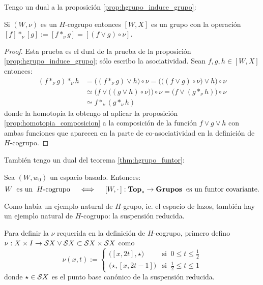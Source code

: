 \documentclass[../../topologia_algebraica]{subfiles}
\begin{document}
Tengo un dual a la proposici\'on \ref{prop:hgrupo_induce_grupo}:

\begin{prop}
  Si $(W,\nu)$ es un $H$-cogrupo entonces $[W,X]$ es un grupo con la operaci\'on
  $[f]*_{\nu}[g]:=[f*_{\nu}g]=[(f\vee g)\circ\nu]$.
\end{prop}

\begin{proof}
  Esta prueba es el dual de la prueba de la proposici\'on \ref{prop:hgrupo_induce_grupo}; s\'olo
  escribo la asociatividad. Sean $f,g,h\in[W,X]$ entonces:
  \begin{align*}
    (f*_{\nu}g)*_{\nu}h & =
    \big((f*_{\nu}g)\vee h\big)\circ\nu =
    \Big(\big((f\vee g)\circ\nu\big) \vee h\Big) \circ\nu \\ & \simeq
    \Big(f\vee \big((g\vee h)\circ\nu\big)\Big)\circ\nu =
    \big( f \vee (g*_{\nu}h) \big)\circ\nu \\ & \simeq
    f*_{\nu}(g*_{\nu}h)
  \end{align*}
  donde la homotop\'ia la obtengo al aplicar la proposici\'on \ref{prop:homotopia_composicion}
  a la composici\'on de la funci\'on $f\vee g\vee h$ con ambas funciones que aparecen en la parte
  de co-asociatividad en la definici\'on de $H$-cogrupo.  
\end{proof}

Tambi\'en tengo un dual del teorema \ref{thm:hgrupo_funtor}:

\begin{thm}\label{thm:hcogrupo_funtor}
  Sea $(W,w_0)$ un espacio basado. Entonces:
  \[
    W \;\;\text{es un}\;\;H\text{-cogrupo} \quad\iff\quad
    [W,\cdot\,]:\mathbf{Top}_*\rightarrow\mathbf{Grupos}\;\;\text{es un funtor covariante}.
  \]
\end{thm}

Como hab\'ia un ejemplo natural de $H$-grupo, ie. el espacio de lazos, tambi\'en hay un ejemplo
natural de $H$-cogrupo: la suspensi\'on reducida.

Para definir la $\nu$ requerida en la definici\'on de $H$-cogrupo, primero defino
$\nu:X\times I \rightarrow \mathcal{S} X\vee\mathcal{S} X \subset \mathcal{S} X\times \mathcal{S} X$ como
\[
  \nu(x,t):=
  \begin{cases}
    \big([x,2t],\star \big) & \text{si}\;\; 0\leq t\leq\frac{1}{2} \\
    \big(\star,[x,2t-1] \big) & \text{si}\;\; \frac{1}{2}\leq t\leq 1
  \end{cases}
\]
donde $\star\in\mathcal{S} X$ es el punto base can\'onico de la suspensi\'on reducida.
\end{document}
